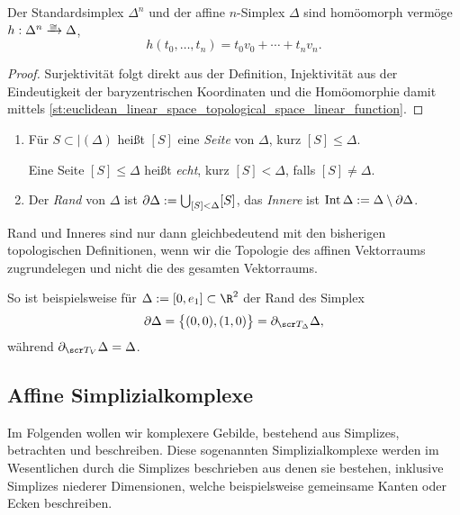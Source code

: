 \begin{nt} \label{nt:standard_simplex_affine_simplex_homeomorphism}
	Der Standardsimplex $\Delta^n$ und der affine $n$-Simplex $\Delta$ sind homöomorph vermöge $h: \Delta^n \homto \Delta$,
	\[
		h(t_0, \dotsc, t_n) = t_0 v_0 + \dotsb + t_n v_n.
	\]
	\begin{proof}
		Surjektivität folgt direkt aus der Definition, Injektivität aus der Eindeutigkeit der baryzentrischen Koordinaten und die Homöomorphie damit mittels \ref{st:euclidean_linear_space_topological_space_linear_function}.
	\end{proof}
\end{nt}

\begin{df}
	\begin{enumerate}[1)]
		\item
			Für $S \subset \vert(\Delta)$ heißt $[S]$ eine \emph{Seite} von $\Delta$, kurz $[S] \le \Delta$.

			Eine Seite $[S] \le \Delta$ heißt \emph{echt}, kurz $[S] < \Delta$, falls $[S] \neq \Delta$.
		\item
			Der \emph{Rand} von $\Delta$ ist $\partial \Delta := \bigcup_{[S] < \Delta} [S]$, das \emph{Innere} ist $\operatorname{Int} \Delta := \Delta \setminus \partial \Delta$.
	\end{enumerate}
	\begin{note}
		Rand und Inneres sind nur dann gleichbedeutend mit den bisherigen topologischen Definitionen, wenn wir die Topologie des affinen Vektorraums zugrundelegen und nicht die des gesamten Vektorraums.

		So ist beispielsweise für $\Delta := [0,e_1] \subset \R^2$ der Rand des Simplex
		\[
			\boundary \Delta
			= \big\{(0,0), (1,0)\big\}
			= \boundary_{\scr T_\Delta} \Delta,
		\]
		während $\boundary_{\scr T_V} \Delta = \Delta$.
	\end{note}
\end{df}


\subsection{Affine Simplizialkomplexe}

Im Folgenden wollen wir komplexere Gebilde, bestehend aus Simplizes, betrachten und beschreiben.
Diese sogenannten Simplizialkomplexe werden im Wesentlichen durch die Simplizes beschrieben aus denen sie bestehen, inklusive Simplizes niederer Dimensionen, welche beispielsweise gemeinsame Kanten oder Ecken beschreiben.

